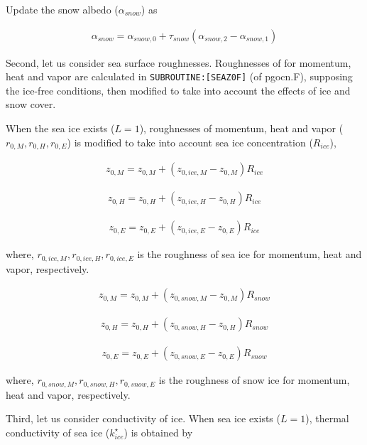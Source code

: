 Update the snow albedo (\(\alpha_{snow}\)) as

\begin{eqnarray}
    \alpha_{snow} = \alpha_{snow,0} + \tau_{snow}(\alpha_{snow,2}-\alpha_{snow,1})
\end{eqnarray}

Second, let us consider sea surface roughnesses. Roughnesses of for momentum, heat and vapor are calculated in \texttt{SUBROUTINE:{[}SEAZ0F{]}} (of pgocn.F), supposing the ice-free conditions, then
modified to take into account the effects of ice and snow cover.

When the sea ice exists (\(L=1\)), roughnesses of momentum, heat and vapor (\(r_{0,M},r_{0,H},r_{0,E}\)) is modified to take into account sea ice concentration (\(R_{ice}\)),

\begin{eqnarray}
    z_{0,M} = z_{0,M} + ( z_{0,ice,M} - z_{0,M})  R_{ice}
\end{eqnarray}

\begin{eqnarray}
    z_{0,H} = z_{0,H} + ( z_{0,ice,H} - z_{0,H})  R_{ice}
\end{eqnarray}

\begin{eqnarray}
    z_{0,E} = z_{0,E} + ( z_{0,ice,E} - z_{0,E})  R_{ice}
\end{eqnarray}

where, \(r_{0,ice,M},r_{0,ice,H},r_{0,ice,E}\) is the roughness of sea ice for momentum, heat and vapor, respectively.

\begin{eqnarray}
    z_{0,M} = z_{0,M} + ( z_{0,snow,M} - z_{0,M})  R_{snow}
\end{eqnarray}

\begin{eqnarray}
    z_{0,H} = z_{0,H} + ( z_{0,snow,H} - z_{0,H})  R_{snow}
\end{eqnarray}

\begin{eqnarray}
    z_{0,E} = z_{0,E} + ( z_{0,snow,E} - z_{0,E})  R_{snow}
\end{eqnarray}

where, \(r_{0,snow,M},r_{0,snow,H},r_{0,snow,E}\) is the roughness of snow ice for momentum, heat and vapor, respectively.

Third, let us consider conductivity of ice. When sea ice exists (\(L=1\)), thermal conductivity of sea ice (\(k_{ice}^\star\)) is obtained by

